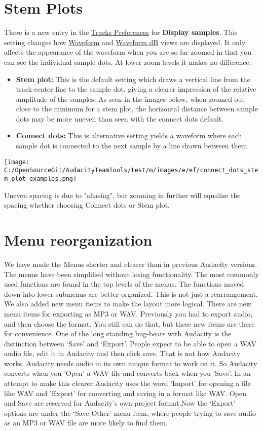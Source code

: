 \begin{multicols}{2}
\section{Stem Plots}There is a new entry in the 
\hyperref[tracks_preferences_]{Tracks Preferences}
 for \textbf{Display samples}.  This setting changes how 
\hyperref[audacity_waveform_]{Waveform}
 and 
\hyperref[audacity_waveform__db]{Waveform dB}
 views are displayed.  It only affects the appearance of the waveform when you are so far zoomed in that you can see the individual sample dots.  At lower zoom levels it makes no difference.  

\begin{itemize}
\item \textbf{Stem plot:} This is the default setting which draws a vertical line from the track center line to the sample dot, giving a clearer impression of the relative amplitude of the samples. As seen in the images below, when zoomed out close to the minimum for a stem plot, the horizontal distance between sample dots may be more uneven than seen with the connect dots default.   
\item \textbf{Connect dots:} This is alternative setting yields a waveform where each sample dot is connected to the next sample by a line drawn between them.  
\end{itemize}
\par \texttt{[image: C:/OpenSourceGit/AudacityTeamTools/test/m/images/e/ef/connect\_dots\_stem\_plot\_examples.png]}\par Uneven spacing is due to "aliasing", but zooming in further will equalize the spacing whether choosing Connect dots or Stem plot.
\section{Menu reorganization}We have made the Menus shorter and clearer than in previous Audacity versions. The menus have been simplified without losing functionality. The most commonly used functions are found in the top levels of the menus. The functions moved down into lower submenus are better organized.
This is not just a rearrangement.  We also added new menu items to make the layout more logical.  There are new menu items for exporting as MP3 or WAV. Previously you had to export audio, and then choose the format. You still can do that, but these new items are there for convenience.
One of the long standing bug-bears with Audacity is the distinction between ‘Save’ and ‘Export’. People expect to be able to open a WAV audio file, edit it in Audacity and then click save. That is not how Audacity works. Audacity needs audio in its own unique format to work on it. So Audacity converts when you 'Open' a WAV file and converts back when you 'Save'. In an attempt to make this clearer Audacity uses the word 'Import' for opening a file like WAV and 'Export' for converting and saving in a format like WAV. Open and Save are reserved for Audacity's own project format.Now the ‘Export’ options are under the ‘Save Other’ menu item, where people trying to save audio as an MP3 or WAV file are more likely to find them.

\end{multicols}
